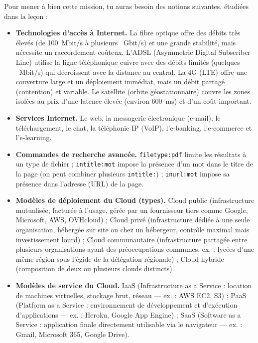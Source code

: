 \documentclass[11pt]{article}
\newcommand{\cle}[1]{{\popxbold\color{popdark}#1}}
\newcounter{popsec}
\newcounter{popsub}
\newcommand{\courssub}[1]{%
  \stepcounter{popsub}%
  \par\vspace{9pt}\noindent{\popxbold\fontsize{11.5}{13}\selectfont\color{popink}{\color{poporange}\thepopsec.\thepopsub}\hspace{6pt}#1}\par\nopagebreak\vspace{4pt}
}
\begin{document}
\courssub{Ressources à mobiliser}

Pour mener à bien cette mission, tu auras besoin des notions suivantes, étudiées dans la leçon :

\begin{itemize}
  \item \textbf{Technologies d'accès à Internet.} La fibre optique offre des débits très élevés (de \SI{100}{Mbit/s} à plusieurs \SI{}{Gbit/s}) et une grande stabilité, mais nécessite un raccordement coûteux. L'ADSL (Asymmetric Digital Subscriber Line) utilise la ligne téléphonique cuivre avec des débits limités (quelques \SI{}{Mbit/s}) qui décroissent avec la distance au central. La 4G (LTE) offre une couverture large et un déploiement immédiat, mais un débit partagé (contention) et variable. Le satellite (orbite géostationnaire) couvre les zones isolées au prix d'une latence élevée (environ \SI{600}{ms}) et d'un coût important.
  \item \textbf{Services Internet.} Le web, la messagerie électronique (e-mail), le téléchargement, le chat, la téléphonie IP (VoIP), l'e-banking, l'e-commerce et l'e-learning.
  \item \textbf{Commandes de recherche avancée.} \texttt{filetype:pdf} limite les résultats à un type de fichier ; \texttt{intitle:mot} impose la présence d'un mot dans le titre de la page (on peut combiner plusieurs \texttt{intitle:}) ; \texttt{inurl:mot} impose sa présence dans l'adresse (URL) de la page.
  \item \textbf{Modèles de déploiement du Cloud (types).} Cloud \cle{public} (infrastructure mutualisée, facturée à l'usage, gérée par un fournisseur tiers comme Google, Microsoft, AWS, OVHcloud) ; Cloud \cle{privé} (infrastructure dédiée à une seule organisation, hébergée sur site ou chez un hébergeur, contrôle maximal mais investissement lourd) ; Cloud \cle{communautaire} (infrastructure partagée entre plusieurs organisations ayant des préoccupations communes, ex. : lycées d'une même région sous l'égide de la délégation régionale) ; Cloud \cle{hybride} (composition de deux ou plusieurs clouds distincts).
  \item \textbf{Modèles de service du Cloud.} \cle{IaaS} (Infrastructure as a Service : location de machines virtuelles, stockage brut, réseau — ex. : AWS EC2, S3) ; \cle{PaaS} (Platform as a Service : environnement de développement et d'exécution d'applications — ex. : Heroku, Google App Engine) ; \cle{SaaS} (Software as a Service : application finale directement utilisable via le navigateur — ex. : Gmail, Microsoft 365, Google Drive).
\end{itemize}
\end{document}
